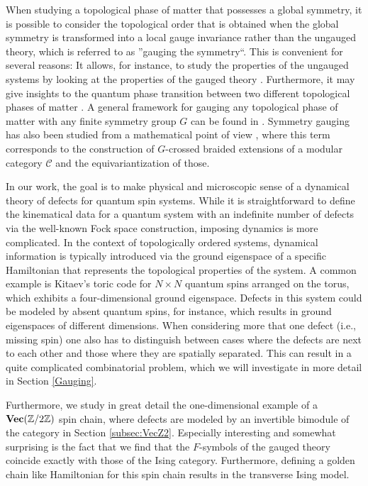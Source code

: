 When studying a topological phase of matter that possesses a global symmetry, it is possible to consider the topological order that is obtained when the global symmetry is transformed into a local gauge invariance rather than the ungauged theory, which is referred to as ''gauging the symmetry``. This is convenient for several reasons: It allows, for instance, to study the properties of the ungauged systems by looking at the properties of the gauged theory \cite{LG12,HW12,Swingle2014,CG14}. Furthermore, it may give insights to the quantum phase transition between two different topological phases of matter \cite{BS09,BW10,BW11,BSS12}. A general framework for gauging any topological phase of matter with any finite symmetry group $G$ can be found in \cite{BBCW14}. Symmetry gauging has also been studied from a mathematical point of view \cite{T00,ENO10,Turaev2010,CGPW16,EMJP18,CSZW18,D19,BJ19}, where this term corresponds to the construction of $G$-crossed braided extensions of a modular category $\mathcal{C}$ and the equivariantization of those.

In our work, the goal is to make physical and microscopic sense of a dynamical theory of defects for quantum spin systems. While it is straightforward to define the kinematical data for a quantum system with an indefinite number of defects via the well-known Fock space construction, imposing dynamics is more complicated. In the context of topologically ordered systems, dynamical information is typically introduced via the ground eigenspace of a specific Hamiltonian that represents the topological properties of the system. A common example is Kitaev's toric code for $N\times N$ quantum spins arranged on the torus, which exhibits a four-dimensional ground eigenspace. Defects in this system could be modeled by absent quantum spins, for instance, which results in ground eigenspaces of different dimensions. When considering more that one defect (i.e., missing spin) one also has to distinguish between cases where the defects are next to each other and those where they are spatially separated. This can result in a quite complicated combinatorial problem, which we will investigate in more detail in Section \ref{Gauging}.

Furthermore, we study in great detail the one-dimensional example of a $\textbf{Vec}(\mathbb{Z}/2\mathbb{Z})$ spin chain, where defects are modeled by an invertible bimodule of the category in Section \ref{subsec:VecZ2}. Especially interesting and somewhat surprising is the fact that we find that the $F$-symbols of the gauged theory coincide exactly with those of the Ising category. Furthermore, defining a golden chain like Hamiltonian for this spin chain results in the transverse Ising model.